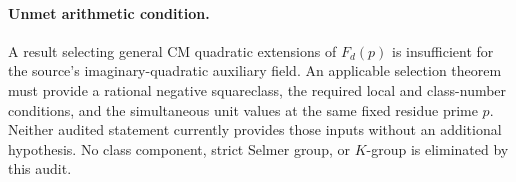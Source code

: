 \paragraph{Unmet arithmetic condition.}
A result selecting general CM quadratic extensions of $F_d(p)$ is
insufficient for the source's imaginary-quadratic auxiliary field.
An applicable selection theorem must provide a rational negative
squareclass, the required local and class-number conditions, and the
simultaneous unit values at the same fixed residue prime $p$.
Neither audited statement currently provides those inputs without
an additional hypothesis.  No class component, strict Selmer group,
or $K$-group is eliminated by this audit.
